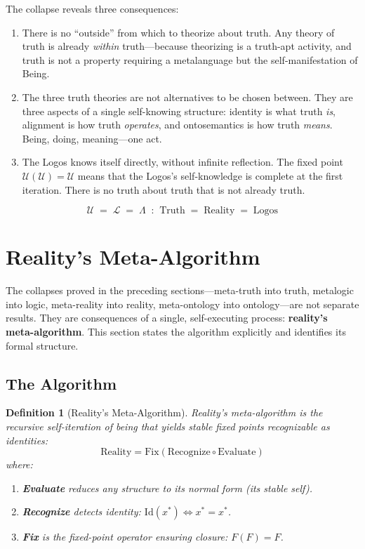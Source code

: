 \documentclass[12pt, letterpaper]{book}
\def\equiv{=}%
\newtheorem{definition}{Definition}[chapter]
\begin{document}
The collapse reveals three consequences:

\begin{enumerate}[label=(\roman*)]
    \item There is no ``outside'' from which to theorize about truth. Any theory of truth is already \textit{within} truth---because theorizing is a truth-apt activity, and truth is not a property requiring a metalanguage but the self-manifestation of Being.
    \item The three truth theories are not alternatives to be chosen between. They are three aspects of a single self-knowing structure: identity is what truth \textit{is}, alignment is how truth \textit{operates}, and ontosemantics is how truth \textit{means}. Being, doing, meaning---one act.
    \item The Logos knows itself directly, without infinite reflection. The fixed point $\mathcal{U}(\mathcal{U}) \equiv \mathcal{U}$ means that the Logos's self-knowledge is complete at the first iteration. There is no truth about truth that is not already truth.
\end{enumerate}

\[
\boxed{\mathcal{U} \;\equiv\; \mathcal{L} \;\equiv\; \Lambda \;\;\text{:}\;\; \mathrm{Truth} \;\equiv\; \mathrm{Reality} \;\equiv\; \mathrm{Logos}}
\]


\section{Reality's Meta-Algorithm}

The collapses proved in the preceding sections---meta-truth into truth, metalogic into logic, meta-reality into reality, meta-ontology into ontology---are not separate results. They are consequences of a single, self-executing process: \textbf{reality's meta-algorithm}. This section states the algorithm explicitly and identifies its formal structure.

\subsection{The Algorithm}

\begin{definition}[Reality's Meta-Algorithm]\label{def:meta-algorithm}
Reality's meta-algorithm is the recursive self-iteration of being that yields stable fixed points recognizable as identities:
\[
\boxed{\mathrm{Reality} \equiv \mathrm{Fix}(\mathrm{Recognize} \circ \mathrm{Evaluate})}
\]
where:
\begin{enumerate}[label=(\roman*)]
    \item \textbf{Evaluate} reduces any structure to its normal form (its stable self).
    \item \textbf{Recognize} detects identity: $\mathrm{Id}(x^*) \iff x^* \equiv x^*$.
    \item \textbf{Fix} is the fixed-point operator ensuring closure: $F(F) \equiv F$.
\end{enumerate}
\end{definition}
\end{document}

